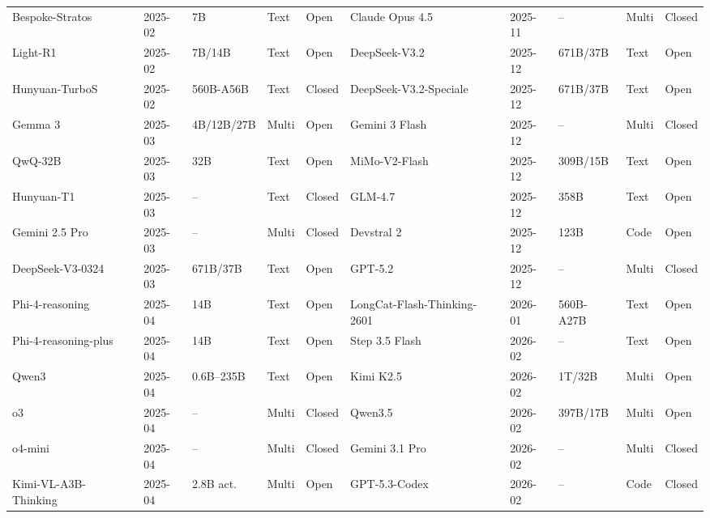\begin{table}[htbp]
{\begin{tabular}{@{} lllll | lllll @{}}
Bespoke-Stratos~\cite{bespokelabs2025stratos7b} & 2025-02 & 7B & Text & Open & Claude Opus 4.5~\cite{anthropic2025claudeopus45} & 2025-11 & -- & Multi & Closed \\
Light-R1~\cite{wen2025lightr1} & 2025-02 & 7B/14B & Text & Open & DeepSeek-V3.2~\cite{deepseekai2025deepseekv32} & 2025-12 & 671B/37B & Text & Open \\
Hunyuan-TurboS~\cite{team2025hunyuan} & 2025-02 & 560B-A56B & Text & Closed & DeepSeek-V3.2-Speciale~\cite{deepseekai2025deepseekv32} & 2025-12 & 671B/37B & Text & Open \\
Gemma 3~\cite{gemmateam2025gemma3technicalreport} & 2025-03 & 4B/12B/27B & Multi & Open & Gemini 3 Flash~\cite{google2025gemini3flash} & 2025-12 & -- & Multi & Closed \\
QwQ-32B~\cite{qwen2025qwq32b} & 2025-03 & 32B & Text & Open & MiMo-V2-Flash~\cite{xiaomi2026mimov2flash} & 2025-12 & 309B/15B & Text & Open \\
Hunyuan-T1~\cite{tencent2025hunyuanT1} & 2025-03 & -- & Text & Closed & GLM-4.7~\cite{zai2025glm47} & 2025-12 & 358B & Text & Open \\
Gemini 2.5 Pro~\cite{google2025gemini25pro} & 2025-03 & -- & Multi & Closed & Devstral 2~\cite{mistral2025devstral2} & 2025-12 & 123B & Code & Open \\
DeepSeek-V3-0324~\cite{deepseek2025deepseekv30324} & 2025-03 & 671B/37B & Text & Open & GPT-5.2~\cite{openai2025gpt52} & 2025-12 & -- & Multi & Closed \\
Phi-4-reasoning~\cite{abdin2025phi4reasoning} & 2025-04 & 14B & Text & Open & LongCat-Flash-Thinking-2601~\cite{team2026longcatflashthinking2601} & 2026-01 & 560B-A27B & Text & Open \\
Phi-4-reasoning-plus~\cite{abdin2025phi4reasoning} & 2025-04 & 14B & Text & Open & Step 3.5 Flash~\cite{stepfun2026step35flash} & 2026-02 & -- & Text & Open \\
Qwen3~\cite{qwen2025qwen3} & 2025-04 & 0.6B--235B & Text & Open & Kimi K2.5~\cite{kimiteam2026kimik25} & 2026-02 & 1T/32B & Multi & Open \\
o3~\cite{openai2025o3o4mini} & 2025-04 & -- & Multi & Closed & Qwen3.5~\cite{qwen2026qwen35} & 2026-02 & 397B/17B & Multi & Open \\
o4-mini~\cite{openai2025o3o4mini} & 2025-04 & -- & Multi & Closed & Gemini 3.1 Pro~\cite{google2026gemini31pro} & 2026-02 & -- & Multi & Closed \\
Kimi-VL-A3B-Thinking~\cite{kimiteam2025kimivl} & 2025-04 & 2.8B act. & Multi & Open & GPT-5.3-Codex~\cite{openai2026gpt53codex} & 2026-02 & -- & Code & Closed \\

\end{tabular}}
\end{table}
